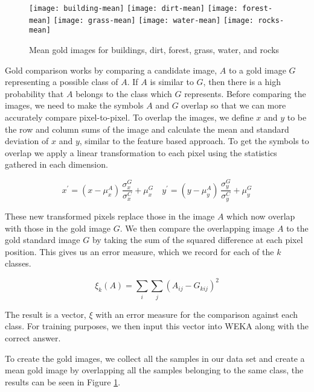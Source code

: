 
\begin{figure}[h]
\texttt{[image: building-mean]}
\texttt{[image: dirt-mean]}
\texttt{[image: forest-mean]}
\texttt{[image: grass-mean]}
\texttt{[image: water-mean]}
\texttt{[image: rocks-mean]}
\caption{Mean gold images for buildings, dirt, forest, grass, water, and rocks}
\label{figure:means}
\end{figure}


Gold comparison works by comparing a candidate image, $A$ to a gold image $G$
representing a possible class of $A$. If $A$ is similar to $G$, then there is a
high probability that $A$ belongs to the class which $G$ represents. Before
comparing the images, we need to make the symbols $A$ and $G$ overlap so that
we can more accurately compare pixel-to-pixel.  To overlap the images, we
define $x$ and $y$ to be the row and column sums of the image and calculate the
mean and standard deviation of $x$ and $y$, similar to the feature based
approach. To get the symbols to overlap we apply a linear transformation to
each pixel using the statistics gathered in each dimension.

\begin{equation} \label{eq:gold}
x^{\prime} = (x - \mu^{A}_{x}) \, \frac{\sigma^{G}_{x}}{\sigma^{C}_{x}} + \mu^{G}_{x} \quad
y^{\prime} = (y - \mu^{A}_{y}) \, \frac{\sigma^{G}_{y}}{\sigma^{C}_{y}} + \mu^{G}_{y}
\end{equation}

These new transformed pixels replace those in the image $A$ which now overlap
with those in the gold image $G$. We then compare the overlapping image $A$ to
the gold standard image $G$ by taking the sum of the squared difference at each
pixel position. This gives us an error measure, which we record for each of the
$k$ classes.

\[ \xi_{k}(A) = \sum_{i}\sum_{j}{(A_{ij} - G_{kij})^{2}} \]

The result is a vector, $\xi$ with an error measure for the comparison against
each class. For training purposes, we then input this vector into WEKA along
with the correct answer.

To create the gold images, we collect all the samples in our data set and
create a mean gold image by overlapping all the samples belonging to the same
class, the results can be seen in Figure \ref{figure:means}.
